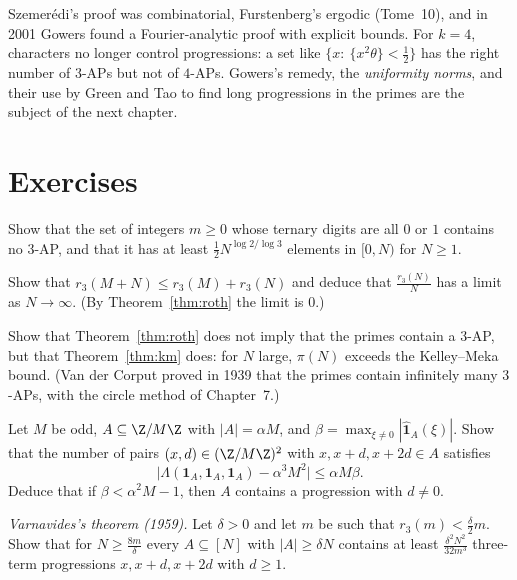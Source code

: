 Szemerédi's proof was combinatorial, Furstenberg's ergodic (Tome~10), and in 2001 Gowers found a Fourier-analytic proof with explicit bounds. For $k=4$, characters no longer control progressions: a set like $\{x:\ \{x^2\theta\}<\frac12\}$ has the right number of $3$-APs but not of $4$-APs. Gowers's remedy, the \emph{uniformity norms}, and their use by Green and Tao to find long progressions in the primes are the subject of the next chapter.

\section{Exercises}

\begin{exercise}[$\star$]\label{ex:base3}
Show that the set of integers $m\ge0$ whose ternary digits are all $0$ or $1$ contains no $3$-AP, and that it has at least $\frac12N^{\log2/\log3}$ elements in $[0,N)$ for $N\ge1$.
\end{exercise}

\begin{exercise}[$\star$]\label{ex:fekete}
Show that $r_3(M+N)\le r_3(M)+r_3(N)$ and deduce that $\frac{r_3(N)}N$ has a limit as $N\to\infty$. (By Theorem~\ref{thm:roth} the limit is $0$.)
\end{exercise}

\begin{exercise}[$\star$]\label{ex:primes}
Show that Theorem~\ref{thm:roth} does not imply that the primes contain a $3$-AP, but that Theorem~\ref{thm:km} does: for $N$ large, $\pi(N)$ exceeds the Kelley--Meka bound. (Van der Corput proved in 1939 that the primes contain infinitely many $3$-APs, with the circle method of Chapter~7.)
\end{exercise}

\begin{exercise}[$\star\star$]\label{ex:pseudo}
Let $M$ be odd, $A\subseteq\Z/M\Z$ with $|A|=\alpha M$, and $\beta=\max_{\xi\neq0}|\hat{\mathbf1}_A(\xi)|$. Show that the number of pairs $(x,d)\in(\Z/M\Z)^2$ with $x,x+d,x+2d\in A$ satisfies
\[
\bigl|\Lambda(\mathbf1_A,\mathbf1_A,\mathbf1_A)-\alpha^3M^2\bigr|\le\alpha M\beta.
\]
Deduce that if $\beta<\alpha^2M-1$, then $A$ contains a progression with $d\neq0$.
\end{exercise}

\begin{exercise}[$\star\star$]\label{ex:varnavides}
\emph{Varnavides's theorem (1959).} Let $\delta>0$ and let $m$ be such that $r_3(m)<\frac\delta2m$. Show that for $N\ge\frac{8m}\delta$ every $A\subseteq[N]$ with $|A|\ge\delta N$ contains at least $\frac{\delta^2N^2}{32m^3}$ three-term progressions $x,x+d,x+2d$ with $d\ge1$.
\end{exercise}

